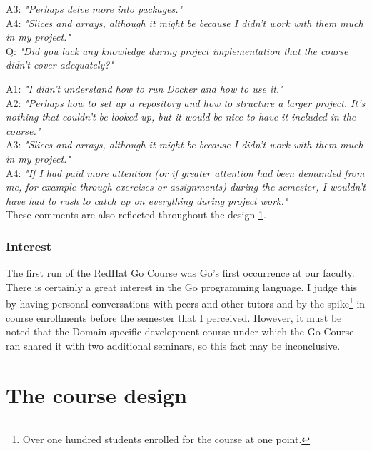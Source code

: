 \documentclass[
  digital,
  color,
  oneside,
  nosansbold,
  nocolorbold,
  lof,
  lot,
]{fithesis4}
\begin{document}
\noindent
A3: \textit{"Perhaps delve more into packages."} \\

\noindent
A4: \textit{"Slices and arrays, although it might be because I didn't work with them much in my project."} \\

\noindent
Q: \textit{"Did you lack any knowledge during project implementation that the course didn't cover adequately?"}

\noindent
A1: \textit{"I didn't understand how to run Docker and how to use it."} \\

\noindent
A2: \textit{"Perhaps how to set up a repository and how to structure a larger project. It's nothing that couldn't be looked up, but it would be nice to have it included in the course."} \\

\noindent
A3: \textit{"Slices and arrays, although it might be because I didn't work with them much in my project."} \\

\noindent
A4: \textit{"If I had paid more attention (or if greater attention had been demanded from me, for example through exercises or assignments) during the semester, I wouldn't have had to rush to catch up on everything during project work."} \\

\noindent
These comments are also reflected throughout the design \cref{chapter-design}.

\subsection{Interest}

The first run of the RedHat Go Course was Go's first occurrence at our faculty. There is certainly a great interest in the Go programming language. I judge this by having personal conversations with peers and other tutors and by the spike\footnote{Over one hundred students enrolled for the course at one point.}
in course enrollments before the semester that I perceived. However, it must be noted that the Domain-specific development course under which the Go Course ran shared it with two additional seminars, so this fact may be inconclusive.

\chapter{The course design}\label{chapter-design}
\end{document}
